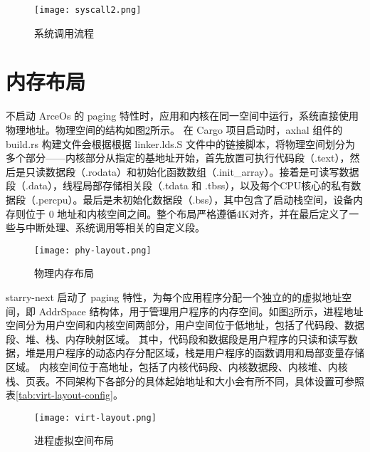 \begin{figure}[H]
    \centering
    \texttt{[image: syscall2.png]}
    \caption{系统调用流程}
    \label{fig:syscall}
\end{figure}


\section{内存布局}

不启动 ArceOs 的 paging 特性时，应用和内核在同一空间中运行，系统直接使用物理地址。物理空间的结构如图\ref{fig:phy-layout}所示。
在 Cargo 项目启动时，axhal 组件的 build.rs 构建文件会根据根据 linker.lds.S 文件中的链接脚本，将物理空间划分为多个部分——内核部分从指定的基地址开始，首先放置可执行代码段（.text），然后是只读数据段（.rodata）和初始化函数数组（.init\_array）。接着是可读写数据段（.data），线程局部存储相关段（.tdata 和 .tbss），以及每个CPU核心的私有数据段（.percpu）。最后是未初始化数据段（.bss），其中包含了启动栈空间，设备内存则位于 0 地址和内核空间之间。整个布局严格遵循4K对齐，并在最后定义了一些与中断处理、系统调用等相关的自定义段。


\begin{figure}[H]
    \centering
    \texttt{[image: phy-layout.png]}
    \caption{物理内存布局}
    \label{fig:phy-layout}
\end{figure}

starry-next 启动了 paging 特性，为每个应用程序分配一个独立的的虚拟地址空间，即 AddrSpace 结构体，用于管理用户程序的内存空间。如图\ref{fig:virt-layout}所示，进程地址空间分为用户空间和内核空间两部分，用户空间位于低地址，包括了代码段、数据段、堆、栈、内存映射区域。
其中，代码段和数据段是用户程序的只读和读写数据，堆是用户程序的动态内存分配区域，栈是用户程序的函数调用和局部变量存储区域。
内核空间位于高地址，包括了内核代码段、内核数据段、内核堆、内核栈、页表。不同架构下各部分的具体起始地址和大小会有所不同，具体设置可参照表\ref{tab:virt-layout-config}。
\begin{figure}[H]
    \centering
    \texttt{[image: virt-layout.png]}
    \caption{进程虚拟空间布局}
    \label{fig:virt-layout}
\end{figure}

